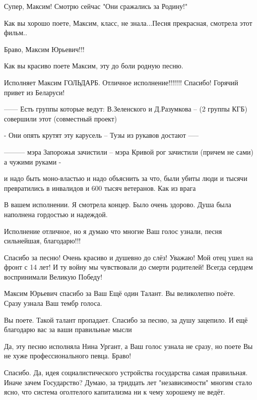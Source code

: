 \begin{itemize}
\begin{multicols}{2}
Супер, Максим! Смотрю сейчас "Они сражались за Родину!"

Как вы хорошо поете,  Максим, класс, не знала...Песня  прекрасная, смотрела этот фильм..

Браво, Максим Юрьевич!!!

Как вы красиво поете Максим, эту до боли родную песню.

Исполняет Максим ГОЛЬДАРБ.
Отличное исполнение!!!!!!! Спасибо! 
Горячий привет из Беларуси!

\begin{itemize} %

------ Есть группы которые ведут: В.Зеленского и Д.Разумкова -- (2 группы КГБ)
совершили этот (совместный проект)

 - Они опять крутят эту карусель -- Тузы из рукавов  достают -----

 ---------  мэра Запорожья зачистили -- мэра Кривой рог зачистили  (причем не
 сами) а чужими руками - 

и надо быть моно-властью и надо объяснить за что, были убиты люди и тысячи
превратились в инвалидов  и 600 тысяч ветеранов. Как из врага 
\end{itemize} %

В вашем исполнении. Я смотрела концер. Было очень здорово. Душа была наполнена гордостью и надеждой.

Исполнение отличное, но  я думаю что многие Ваш голос узнали, песня сильнейшая, благодарю!!!


Спасибо за песню! Очень красиво и душевно до слёз! Уважаю! Мой отец ушел на
фронт с 14 лет! И ту войну мы чувствовали до смерти родителей!  Всегда сердцем
воспринимали Великую Победу!

Максим Юрьевич спасибо за Ваш Ещё один Талант. Вы великолепно поёте. Сразу узнала Ваш тембр голоса.

Вы поете. Такой талант пропадает. Спасибо за песню, за душу зацепило. И ещё благодарю вас за ваши правильные мысли

Да, эту песню исполняла Нина Ургант, а Ваш голос узнала не сразу, но поете Вы
не хуже профессионального певца. Браво!



Спасибо. Да, идея социалистического устройства государства самая правильная.
Иначе зачем Государство?  Думаю, за тридцать лет "независимости" многим стало
ясно, что система оголтелого капитализма ни к чему хорошему не ведёт.


\end{multicols}
\end{itemize}
